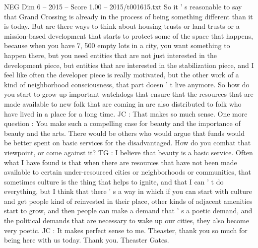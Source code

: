 \begin{textsample}{NEG Dim 6 – 2015 – Score 1.00 – 2015/t001615.txt}
So it ' s reasonable to say that Grand Crossing is already in the process of being something different than it is today.
But are there ways to think about housing trusts or land trusts or a mission-based development that starts to protect some of the space that happens, because when you have 7, 500 empty lots in a city, you want something to happen there, but you need entities that are not just interested in the development piece, but entities that are interested in the stabilization piece, and I feel like often the developer piece is really motivated, but the other work of a kind of neighborhood consciousness, that part doesn ' t live anymore.
So how do you start to grow up important watchdogs that ensure that the resources that are made available to new folk that are coming in are also distributed to folk who have lived in a place for a long time.
JC : That makes so much sense.
One more question : You make such a compelling case for beauty and the importance of beauty and the arts.
There would be others who would argue that funds would be better spent on basic services for the disadvantaged.
How do you combat that viewpoint, or come against it?
TG : I believe that beauty is a basic service.
Often what I have found is that when there are resources that have not been made available to certain under-resourced cities or neighborhoods or communities, that sometimes culture is the thing that helps to ignite, and that I can ' t do everything, but I think that there ' s a way in which if you can start with culture and get people kind of reinvested in their place, other kinds of adjacent amenities start to grow, and then people can make a demand that ' s a poetic demand, and the political demands that are necessary to wake up our cities, they also become very poetic.
JC : It makes perfect sense to me.
Theaster, thank you so much for being here with us today.
Thank you.
Theaster Gates.

\end{textsample}
